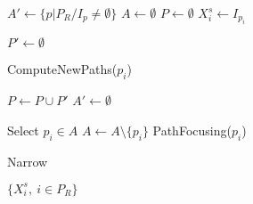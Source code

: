 \STATE $A' \gets \{p | P_R / I_p \neq \emptyset\}$
\STATE $A \gets \emptyset$
\STATE $P \gets \emptyset$ 
	\STATE $X_i^s \gets I_{p_i}$ \label{alg=X-init}
\ENDFOR 
{}

\STATE $P' \gets \emptyset$ 
	
\label{alg=start-add-paths}
\STATE ComputeNewPaths($p_i$) \label{alg=computeNewPaths}
\ENDFOR \label{alg=end-add-paths}

\STATE $P \gets P \cup P'$
\STATE $A' \gets \emptyset$

\STATE {}
 \label{alg=start-ascending} 
	\STATE Select $p_i \in A$
	\STATE $A \gets A \setminus \{p_i\}$
	\STATE PathFocusing($p_i$) 
	
\ENDWHILE \label{alg=end-ascending}
\STATE Narrow \label{alg=narrowing}
\ENDWHILE

\STATE \RETURN $\{X_i^s,\ i \in P_R\}$

